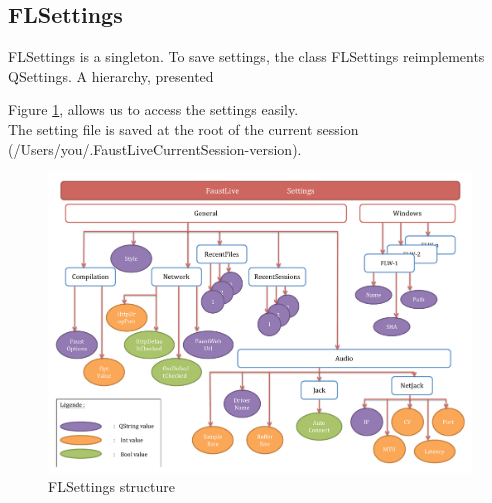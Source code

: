 \documentclass[a4paper]{article}
\begin{document}
\subsection{FLSettings}

FLSettings is a singleton. 
To save settings, the class FLSettings reimplements QSettings. A hierarchy, presented {Figure \ref{fig:FLSettings}, allows us to access the settings easily. \\

The setting file is saved at the root of the current session (/Users/you/.FaustLiveCurrentSession-version).

\begin{figure}[!h]
\begin{center}
\includegraphics[width=\columnwidth]{images/FLSettings}
\caption{FLSettings structure}
\label{fig:FLSettings}
\end{center}
\end{figure}

}
\end{document}
